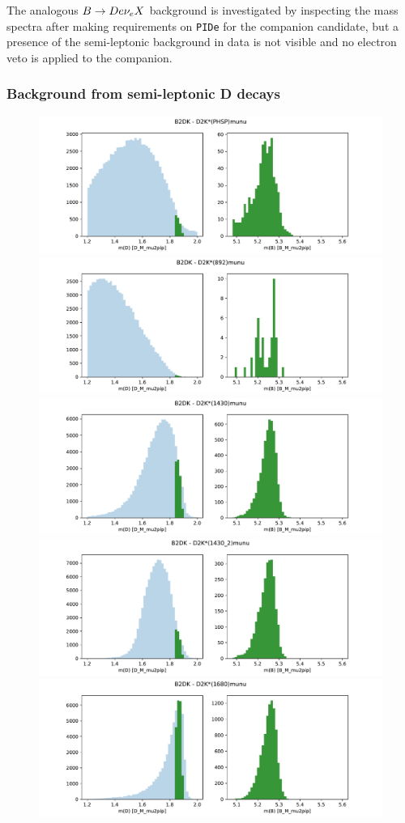 The analogous ${B}\rightarrow{\ensuremath{D}} e\nu_e X$ background is investigated by inspecting the \B mass spectra after making requirements on \texttt{PIDe} for the companion candidate, but a presence of the semi-leptonic background in data is not visible and no electron veto is applied to the companion.


\subsubsection{Background from semi-leptonic D decays} %
\label{ssub:background_from_semi_leptonic_d_decays}

\begin{figure}[tbp]
    \centering
    \includegraphics[width=0.6\columnwidth]{figures/analysis/semileptonic_bkgs/D2Kstar_PHSP_munu.pdf}
    \includegraphics[width=0.6\columnwidth]{figures/analysis/semileptonic_bkgs/D2Kstar_892_munu.pdf}
    \includegraphics[width=0.6\columnwidth]{figures/analysis/semileptonic_bkgs/D2Kstar_1430_munu.pdf}
    \includegraphics[width=0.6\columnwidth]{figures/analysis/semileptonic_bkgs/D2Kstar_1430_2_munu.pdf}
    \includegraphics[width=0.6\columnwidth]{figures/analysis/semileptonic_bkgs/D2Kstar_1680_munu.pdf}

\end{figure}
